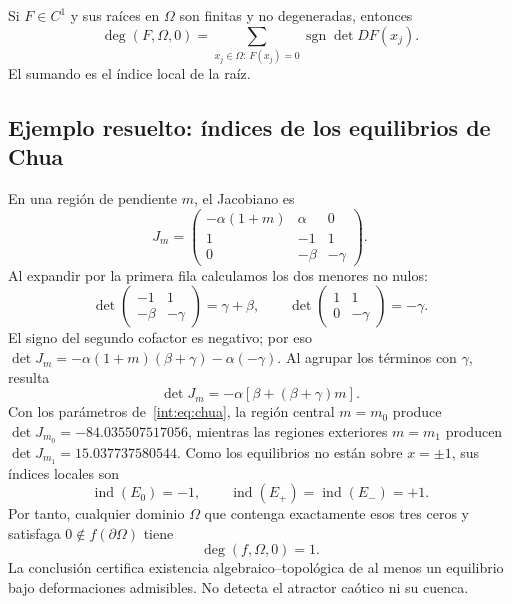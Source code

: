 Si \(F\in C^1\) y sus raíces en \(\Omega\) son finitas y no degeneradas,
entonces
\begin{equation}
 \deg(F,\Omega,0)=
 \sum_{x_j\in\Omega:\,F(x_j)=0}\operatorname{sgn}\det DF(x_j).
 \label{geo:eq:degree-sum}
\end{equation}
El sumando es el índice local de la raíz.



\subsection{Ejemplo resuelto: índices de los equilibrios de Chua}

En una región de pendiente \(m\), el Jacobiano es
\[
 J_m=\begin{pmatrix}
 -\alpha(1+m)&\alpha&0\\
 1&-1&1\\
 0&-\beta&-\gamma
 \end{pmatrix}.
\]
Al expandir por la primera fila calculamos los dos menores no nulos:
\[
 \det\begin{pmatrix}-1&1\\-\beta&-\gamma\end{pmatrix}=\gamma+\beta,
 \qquad
 \det\begin{pmatrix}1&1\\0&-\gamma\end{pmatrix}=-\gamma.
\]
El signo del segundo cofactor es negativo; por eso
\(\det J_m=-\alpha(1+m)(\beta+\gamma)-\alpha(-\gamma)\).
Al agrupar los términos con \(\gamma\), resulta
\begin{equation}
 \det J_m=-\alpha[\beta+(\beta+\gamma)m].
 \label{geo:eq:chua-index-det}
\end{equation}
Con los parámetros de~\eqref{int:eq:chua}, la región central \(m=m_0\)
produce \(\det J_{m_0}=-84.035507517056\), mientras las regiones exteriores
\(m=m_1\) producen \(\det J_{m_1}=15.037737580544\). Como los equilibrios no
están sobre \(x=\pm1\), sus índices locales son
\begin{equation}
 \operatorname{ind}(E_0)=-1,\qquad
 \operatorname{ind}(E_+)=\operatorname{ind}(E_-)=+1.
 \label{geo:eq:chua-equilibrium-indices}
\end{equation}
Por tanto, cualquier dominio \(\Omega\) que contenga exactamente esos tres
ceros y satisfaga \(0\notin f(\partial\Omega)\) tiene
\begin{equation}
 \deg(f,\Omega,0)=1.
 \label{geo:eq:chua-degree}
\end{equation}
La conclusión certifica existencia algebraico--topológica de al menos un
equilibrio bajo deformaciones admisibles. No detecta el atractor caótico ni
su cuenca.

